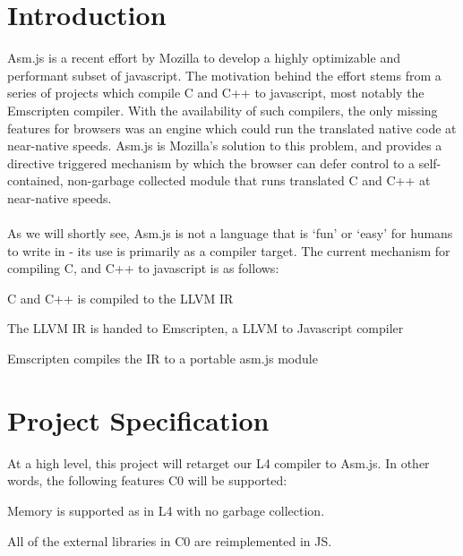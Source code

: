 \documentclass[twoside]{article}
\begin{document}
\begin{multicols}{2} %

\section{Introduction}


Asm.js is a recent effort by Mozilla to develop a highly optimizable and performant
subset of javascript. The motivation behind the effort stems from a series of projects which
compile C and C++ to javascript, most notably the Emscripten compiler. With the availability of such
compilers, the only missing features for browsers was an engine which could run the
translated native code at near-native speeds. Asm.js is Mozilla's solution to this problem,
and provides a directive triggered mechanism by which the browser can defer control to a
self-contained, non-garbage collected module that runs translated C and C++ at near-native speeds. \\
\\
As we will shortly see, Asm.js is not a language that is `fun' or `easy' for humans to write in -
its use is primarily as a compiler target. The current mechanism for compiling C, and C++ to
javascript is as follows:

\begin{compactitem}
  \item C and C++ is compiled to the LLVM IR
  \item The LLVM IR is handed to Emscripten, a LLVM to Javascript compiler
  \item Emscripten compiles the IR to a portable asm.js module
\end{compactitem}



\section{Project Specification}

At a high level, this project will retarget our L4 compiler to Asm.js. In other
words, the following features C0 will be supported:

    Memory is supported as in L4 with no garbage collection.

    All of the external libraries in C0 are reimplemented in JS.


\end{multicols}
\end{document}
